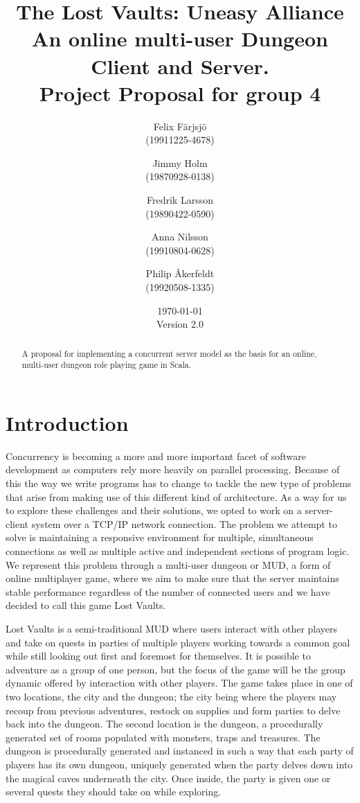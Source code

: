 \documentclass[a4paper]{article}
\title{The Lost Vaults: Uneasy Alliance\\\small{An online multi-user Dungeon Client and Server.}\\\small{Project Proposal for group 4}}
\author{Felix Färjsjö\\(19911225-4678) \and Jimmy Holm\\(19870928-0138) \and Fredrik Larsson\\(19890422-0590) \and Anna Nilsson\\(19910804-0628) \and Philip Åkerfeldt\\(19920508-1335)}
\date{\today\\Version 2.0}
\begin{document}
\maketitle
\newpage
\begin{abstract}
A proposal for implementing a concurrent server model as the basis for an online, multi-user dungeon role playing game in Scala.
\end{abstract}

\tableofcontents
\listoffigures
\newpage
\section{Introduction}
Concurrency is becoming a more and more important facet of software development as computers rely more heavily on parallel processing. Because of this the way we write programs has to change 
to tackle the new type of problems that arise from making use of this different kind of architecture. As a way for us to explore these challenges and their solutions, we opted to work on a 
server-client system over a TCP/IP network connection. The problem we attempt to solve is maintaining a responsive environment for multiple, simultaneous connections as well as multiple 
active and independent sections of program logic. We represent this problem through a multi-user dungeon or MUD, a form of online multiplayer game, where we aim to make sure that the server maintains 
stable performance regardless of the number of connected users and we have decided to call this game Lost Vaults.

Lost Vaults is a semi-traditional MUD where users interact with other players and take on quests in parties 
of multiple players working towards a common goal while still looking out first and foremost for themselves. It is possible to adventure as a group of one person, but the focus of the 
game will be the group dynamic offered by interaction with other players. 
The game takes place in one of two locations, the city and the dungeon; the city being where the players may recoup from previous adventures, restock on supplies and 
form parties to delve back into the dungeon. The second location is the dungeon, a procedurally generated set of rooms populated with monsters, traps and treasures.
The dungeon is procedurally generated and instanced in such a way that each party of players has its own dungeon, uniquely generated when the party delves down into 
the magical caves underneath the city. Once inside, the party is given one or several quests they should take on while exploring.
\end{document}
